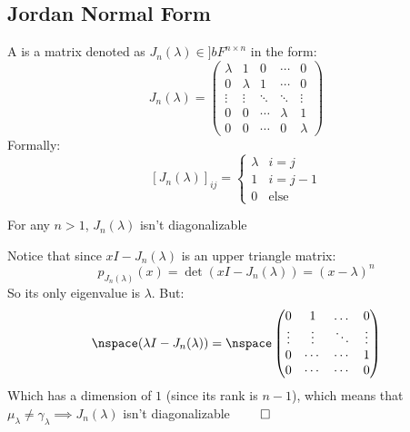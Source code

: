 \documentclass[10pt]{article}
\begin{document}
\newpage
\subsection{Jordan Normal Form}

\begin{definition*}

A  is a matrix denoted as $J_n(\lambda)\in]bF^{n\times n}$ in the form:
\[ J_n(\lambda) = \begin{pmatrix} \lambda & 1 & 0 & \cdots & 0\\ 0 & \lambda & 1 & \cdots & 0 \\ \vdots & \vdots & \ddots & \ddots & \vdots \\ 0 & 0 & \cdots & \lambda & 1 \\ 0 & 0 & \cdots & 0 & \lambda \end{pmatrix} \]
Formally:
\[ [J_n(\lambda)]_{ij} = \begin{cases} \lambda & i=j \\ 1 & i=j-1 \\ 0 & \text{else} \end{cases} \]

\end{definition*}

\begin{statement}{For any $n>1$, $J_n(\lambda)$ isn't diagonalizable}

Notice that since $xI-J_n(\lambda)$ is an upper triangle matrix:
\[ p_{J_n(\lambda)}(x) = \det(xI - J_n(\lambda)) = (x-\lambda)^n \]
So its only eigenvalue is $\lambda$. But:
\[ \nspace(\lambda I - J_n(\lambda)) = \nspace\begin{pmatrix} 0 & 1 & \dots & 0 \\ \vdots & \vdots & \ddots & \vdots \\ 0 & \cdots & \cdots & 1 \\ 0 & \cdots & \cdots & 0 \end{pmatrix} \]
Which has a dimension of $1$ (since its rank is $n-1$), which means that $\mu_\lambda\neq\gamma_\lambda\implies J_n(\lambda)$ isn't diagonalizable $\qed$ 

\end{statement}
\end{document}
